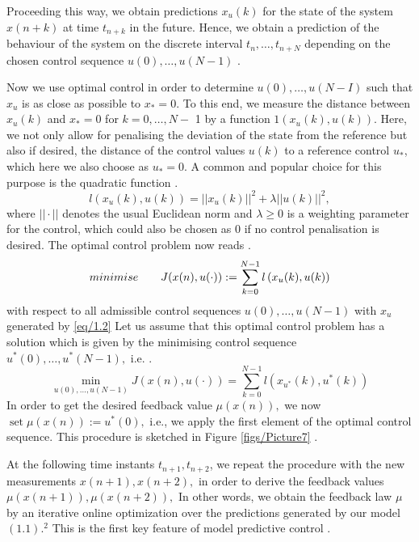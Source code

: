 \documentclass{UoNMCHA}
\numberwithin{equation}{section}
\begin{document}
	Proceeding this way, we obtain predictions $x_{u}(k)$ for the state of the system $x(n+k)$ at time $t_{n+k}$ in
	the future. Hence, we obtain a prediction of the behaviour of the system on the discrete interval
	$t_{n}, \ldots, t_{n+N}$ depending on the chosen control sequence $u(0), \ldots, u(N-1)$ \cite{larsgrune_2017_nonlinear}.
	
	Now we use optimal control in order to determine $u(0), \ldots, u(N-I)$ such that $x_{u}$ is as close as
	possible to $x_{*}=0 .$ To this end, we measure the distance between $x_{u}(k)$ and $x_{*}=0$ for $k=0, \ldots, N-$ 1 by a function $1\left({x}_{{u}}({k}), {u}({k})\right)$. Here, we not only allow for penalising the deviation of the state from
	the reference but also if desired, the distance of the control values $u(k)$ to a reference control $u_{*}$, which
	here we also choose as $u_{*}=0 .$ A common and popular choice for this purpose is the quadratic function \cite{larsgrune_2017_nonlinear}.
	$$
	{l}\left({x}_{{u}}({k}), {u}({k})\right)={\left||{x}_{{u}}({k})\right||}^{2}+\lambda{||u(k)||}^{2},
	$$
	where $|| \cdot ||$ denotes the usual Euclidean norm and $\lambda \geq 0$ is a weighting parameter for the control, which
	could also be chosen as 0 if no control penalisation is desired.
	The optimal control problem now reads \cite{larsgrune_2017_nonlinear}.
	$$
	minimise \hspace*{7 mm}{J}({x}({n}), {u}(\cdot)):=\sum_{{k}=0}^{{N}-1} {l}\left({x}_{{u}}({k}), {u}({k})\right)
	$$
	with respect to all admissible control sequences ${u}(0), \ldots, {u}({N}-1)$ with $x_{u}$ generated by \eqref{eq/1.2}
	Let us assume that this optimal control problem has a solution which is given by the minimising control
	sequence $u^{*}(0), \ldots, u^{*}(N-1),$ i.e. \cite{larsgrune_2017_nonlinear}.
	$$
	\min _{u(0), \ldots, u(N-1)} J(x(n), u(\cdot))=\sum_{k=0}^{N-1} l\left(x_{u^{*}}(k), u^{*}(k)\right)
	$$
	In order to get the desired feedback value $\mu(x(n)),$ we now $\operatorname{set} \mu(x(n)):=u^{*}(0),$
	i.e., we apply the first element of the optimal control sequence. This procedure is sketched in Figure \ref{figs/Picture7} .
	
	
	At the following time instants $t_{n+1}, t_{n+2}$, we repeat the procedure with the new measurements
	$x(n+1), x(n+2),$ in order to derive the feedback values $\mu(x(n+1)), \mu(x(n+2)),$ In other words,
	we obtain the feedback law $\mu$ by an iterative online optimization over the predictions generated by our
	model $(1.1) .^{2}$ This is the first key feature of model predictive control \cite{larsgrune_2017_nonlinear}.
	
\end{document}
